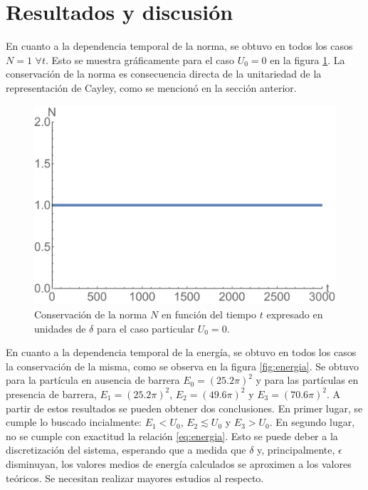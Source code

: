 \documentclass[aps,prb,twocolumn,superscriptaddress,floatfix,longbibliography]{revtex4-2}
\newif\ifptitle
\newif\ifpnumber
\newcounter{para}
\newcommand\ptitle[1]{\par\refstepcounter{para}
{\ifpnumber{\noindent\textcolor{lightgray}{\textbf{\thepara}}\indent}\fi}
{\ifptitle{\textbf{[{#1}]}}\fi}}
\begin{document}
\section{Resultados y discusión}

\ptitle{Conservación de la norma y de la energía}

En cuanto a la dependencia temporal de la norma, se obtuvo en todos los casos $N = 1$ $\forall t$. Esto se muestra gráficamente para el caso $U_0 = 0$ en la figura \ref{fig:norma}. La conservación de la norma es consecuencia directa de la unitariedad de la representación de Cayley, como se mencionó en la sección anterior.

\begin{figure}[h]
\includegraphics[clip=true,width=0.85\columnwidth]{norma.pdf}
\caption{Conservación de la norma $N$ en función del tiempo $t$ expresado en unidades de $\delta$ para el caso particular $U_0 = 0$.}
 \label{fig:norma}
\end{figure}

En cuanto a la dependencia temporal de la energía, se obtuvo en todos los casos la conservación de la misma, como se observa en la figura \ref{fig:energia}. Se obtuvo para la partícula en ausencia de barrera $E_0 = (25.2 \pi)^2$ y para las partículas en presencia de barrera, $E_1 = (25.2 \pi)^2$, $E_2 = (49.6 \pi)^2$ y $E_3 = (70.6 \pi)^2$. A partir de estos resultados se pueden obtener dos conclusiones. En primer lugar, se cumple lo buscado incialmente: $E_1 < U_0$, $E_2 \lesssim U_0$ y $E_3 > U_0$. En segundo lugar, no se cumple con exactitud la relación \ref{eq:energia}. Esto se puede deber a la discretización del sistema, esperando que a medida que $\delta$ y, principalmente, $\epsilon$ disminuyan, los valores medios de energía calculados se aproximen a los valores teóricos. Se necesitan realizar mayores estudios al respecto.
\end{document}
